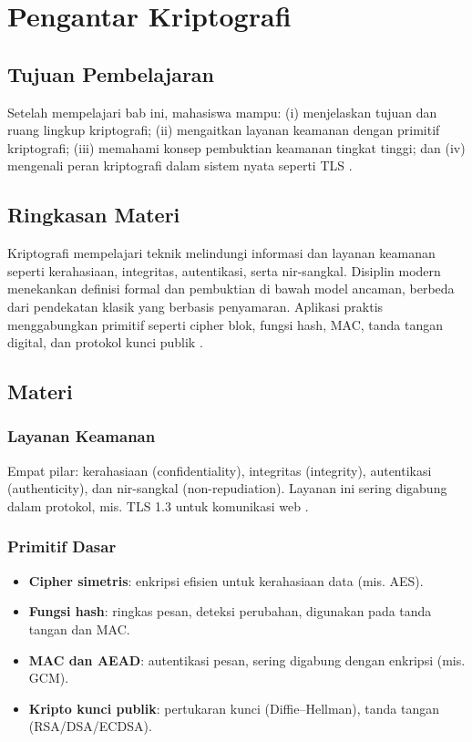 \documentclass[../main.tex]{subfiles}
\begin{document}
\chapter{Pengantar Kriptografi}
\section{Tujuan Pembelajaran}
Setelah mempelajari bab ini, mahasiswa mampu: (i) menjelaskan tujuan dan ruang lingkup kriptografi; (ii) mengaitkan layanan keamanan dengan primitif kriptografi; (iii) memahami konsep pembuktian keamanan tingkat tinggi; dan (iv) mengenali peran kriptografi dalam sistem nyata seperti TLS \citep{rfc8446}.

\section{Ringkasan Materi}
Kriptografi mempelajari teknik melindungi informasi dan layanan keamanan seperti kerahasiaan, integritas, autentikasi, serta nir-sangkal. Disiplin modern menekankan definisi formal dan pembuktian di bawah model ancaman, berbeda dari pendekatan klasik yang berbasis penyamaran. Aplikasi praktis menggabungkan primitif seperti cipher blok, fungsi hash, MAC, tanda tangan digital, dan protokol kunci publik \citep{bonehshoup,shannon1949}.

\section{Materi}
\subsection{Layanan Keamanan}
Empat pilar: kerahasiaan (confidentiality), integritas (integrity), autentikasi (authenticity), dan nir-sangkal (non-repudiation). Layanan ini sering digabung dalam protokol, mis. TLS 1.3 untuk komunikasi web \citep{rfc8446}.

\subsection{Primitif Dasar}
\begin{itemize}
  \item \textbf{Cipher simetris}: enkripsi efisien untuk kerahasiaan data (mis. AES). 
  \item \textbf{Fungsi hash}: ringkas pesan, deteksi perubahan, digunakan pada tanda tangan dan MAC.
  \item \textbf{MAC dan AEAD}: autentikasi pesan, sering digabung dengan enkripsi (mis. GCM).
  \item \textbf{Kripto kunci publik}: pertukaran kunci (Diffie--Hellman), tanda tangan (RSA/DSA/ECDSA).
\end{itemize}
\end{document}
